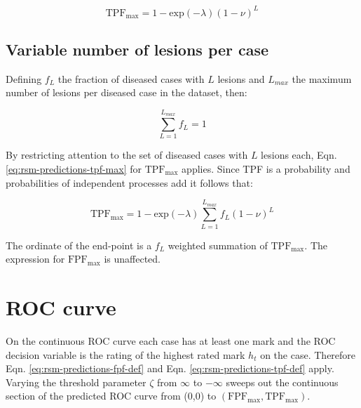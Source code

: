 \documentclass[
]{book}
\begin{document}
\begin{equation}
\text{TPF}_{\text{max}} = 1 - \text{exp} \left ( - \lambda \right ) \left ( 1 - \nu \right )^L
\label{eq:rsm-predictions-tpf-max}
\end{equation}

\hypertarget{rsm-predictions-end-point-variable-number-lesions}{%
\subsection{Variable number of lesions per case}\label{rsm-predictions-end-point-variable-number-lesions}}

Defining \(f_L\) the fraction of diseased cases with \(L\) lesions and \(L_{max}\) the maximum number of lesions per diseased case in the dataset, then:

\begin{equation}
\sum_{L=1}^{{L_{max}}}  f_L = 1
\label{eq:rsm-predictions-fl-sum}
\end{equation}

By restricting attention to the set of diseased cases with \(L\) lesions each, Eqn. \eqref{eq:rsm-predictions-tpf-max} for \(\text{TPF}_{\text{max}}\) applies. Since TPF is a probability and probabilities of independent processes add it follows that:

\begin{equation}
\text{TPF}_{\text{max}} = 1 - \text{exp} \left ( - \lambda \right ) \sum_{L=1}^{L_{max}}f_L \left ( 1 - \nu \right )^L
\label{eq:rsm-predictions-tpf-max-vary-l}
\end{equation}

The ordinate of the end-point is a \(f_L\) weighted summation of \(\text{TPF}_{\text{max}}\). The expression for \(\text{FPF}_{\text{max}}\) is unaffected.

\hypertarget{rsm-predictions-roc-curve}{%
\section{ROC curve}\label{rsm-predictions-roc-curve}}

On the continuous ROC curve each case has at least one mark and the ROC decision variable is the rating of the highest rated mark \(h_t\) on the case. Therefore Eqn. \eqref{eq:rsm-predictions-fpf-def} and Eqn. \eqref{eq:rsm-predictions-tpf-def} apply. Varying the threshold parameter \(\zeta\) from \(\infty\) to \(-\infty\) sweeps out the continuous section of the predicted ROC curve from (0,0) to \(\left (\text{FPF}_{\text{max}}, \text{TPF}_{\text{max}} \right )\).
\end{document}
